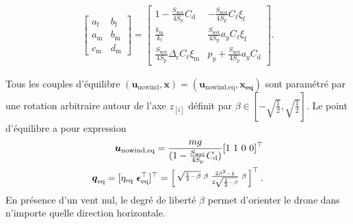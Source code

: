         \begin{align*}
            \left[\!\! \begin{array}{c|c} 
            a_{\text{f}} & b_{\text{f}} \\ \hline
            a_{\text{m}} & b_{\text{m}} \\ \hline
            c_{\text{m}} & d_{\text{m}}
            \end{array} \!\!\right] \!=\!
            \left[\begin{array}{c|c}
            1-\frac{S_{\text{wet}}}{4S_{\text{p}}} C_{\text{d}}  & -\frac{S_{\text{wet}}}{4S_{\text{p}}}C_{\ell}\xi_{\text{f}} \\ \hline
            \frac{k_{\text{m}} }{k_{\text{f}}}  &   \! \frac{S_{\text{wet}}}{4S_{\text{p}}}a_{y}C_{\ell}\xi_{\text{f}} \!\\ \hline
            \!\! \frac{S_{\text{wet}}}{4S_{\text{p}}} \Delta_{\text{r}}C_{\ell}\xi_{\text{m}} \!\! & 
            p_{y}+\frac{S_{\text{wet}}}{4S_{\text{p}}} a_{y} C_{\text{d}}
            \end{array}\right].
        \end{align*}


    Tous les couples d'équilibre $(\boldsymbol{u}_{\text{nowind}}, \boldsymbol{x}) = (\boldsymbol{u}_{\text{nowind},\text{eq}}, \boldsymbol{x_{\text{eq}}})$ sont paramétré par une rotation arbitraire autour de l'axe $z_{[\text{i}]}$ définit par $\beta \in \left[-\sqrt{\frac{1}{2}},\sqrt{\frac{1}{2}}\right]$. Le point d'équilibre a pour expression
    \begin{subequations}
        \label{eq:equilibria}
        \begin{align}
            \label{eq:bar_u}
            \boldsymbol{u}_{\text{nowind},\text{eq}} = \frac{mg}{( 1-\frac{S_{\text{wet}}}{4S_{\text{p}}} C_{\text{d}})} [1~1~0~0]^\top\\
            \boldsymbol{q}_{\text{eq}} = [\eta_{\text{eq}} ~\boldsymbol{\epsilon}_{\text{eq}}^\top]^\top = \left[ \begin{smallmatrix}\sqrt{\frac{1}{2}-\beta} & \beta & \frac{2\beta^{2}-1}{2\sqrt{\frac{1}{2}-\beta}} & \beta \end{smallmatrix} \right]^\top.
        \end{align}
    \end{subequations}
    En présence d'un vent nul, le degré de liberté $\beta$ permet d'orienter le drone dans n'importe quelle direction horizontale.

